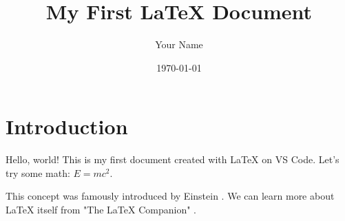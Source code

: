 \documentclass{article}
\title{My First LaTeX Document}
\author{Your Name}
\date{\today}
\begin{document}
\maketitle

\section{Introduction}
Hello, world! This is my first document created with LaTeX on VS Code.
Let's try some math: $E = mc^2$.

This concept was famously introduced by Einstein \cite{einstein}. We can
learn more about LaTeX itself from "The LaTeX Companion" \cite{latex_companion}.

 


\end{document}
